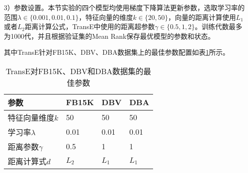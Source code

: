 3）参数设置。本节实验的四个模型均使用梯度下降算法更新参数，选取学习率的范围$\lambda \in \{0.001,0.01,0.1\}$，特征向量的维度$k \in \{20,50\}$，向量的距离计算使用$L_1$或者$L_2$距离计算公式，TransE中使用的距离超参数$\gamma \in \{0.5, 1, 2\}$。训练代数最多为1000代，并且根据验证集的Mean Rank保存最优模型的参数和状态。

其中TransE针对FB15K、DBV、DBA数据集上的最佳参数配置如表\ref{optimal_config}所示。
\begin{table}[H]
\centering
\caption{TransE对FB15K、DBV和DBA数据集的最佳参数}
\begin{tabular}{llll}
\toprule
参数 & FB15K & DBV & DBA \\
\midrule
特征向量维度$k$ & 50 & 50 & 50 \\
学习率$\lambda$ & 0.01 &  0.01 &  0.01 \\
距离参数$\gamma$ & 0.5 & 1 & 1 \\
距离计算式$d$ & $L_2$ & $L_1$ & $L_1$\\
\bottomrule
\end{tabular}
\label{optimal_config}
\end{table}

